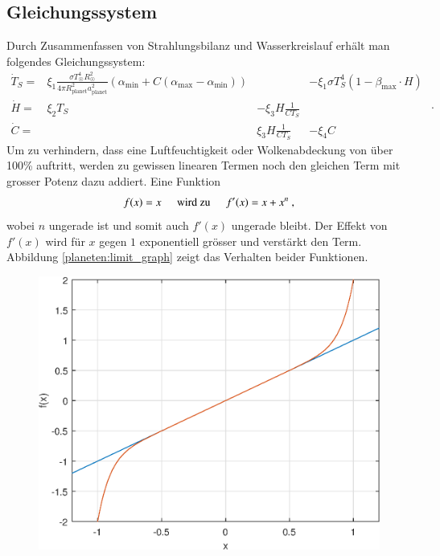\begin{refsection}
\subsection{Gleichungssystem}

Durch Zusammenfassen von Strahlungsbilanz und Wasserkreislauf erhält man folgendes Gleichungssystem:
\begin{equation}
\begin{matrix}
\dot{T}_S = & \xi_1 \frac{\sigma T_{\astrosun}^4 R_{\astrosun}^2}{4 \pi R_{\text{planet}}^2 a_{\text{planet}}^2} (\alpha_{\text{min}} + C(\alpha_{\text{max}} - \alpha_{\text{min}})) && - \xi_1 \sigma T_{S}^4  (1 - \beta_{\text{max}} \cdot H)\\
\dot{H}   = & \xi_2 T_S              & - \xi_3 H \frac{1}{C T_S}          & \\
\dot{C}   = &                        &   \xi_3 H \frac{1}{C T_S}          & - \xi_4 C
\end{matrix} \text{ .}
\end{equation}
Um zu verhindern, dass eine Luftfeuchtigkeit oder Wolkenabdeckung von über 100\% auftritt, werden zu gewissen linearen Termen noch den gleichen Term mit grosser Potenz dazu addiert. Eine Funktion
\begin{equation}
f(x) = x \hspace{0.5cm}\text{wird zu}\hspace{0.5cm} f'(x) = x + x^n \text{ ,}
\end{equation}
wobei $n$ ungerade ist und somit auch $f'(x)$ ungerade bleibt. Der Effekt von $f'(x)$ wird für $x$ gegen $1$ exponentiell grösser und verstärkt den Term. Abbildung \ref{planeten:limit_graph} zeigt das Verhalten beider Funktionen.
\begin{figure}[!h]
	\center
	\includegraphics[height=0.45\textheight]{planeten/Matlab/figures/limiter.eps}

\end{figure}
\end{refsection}
